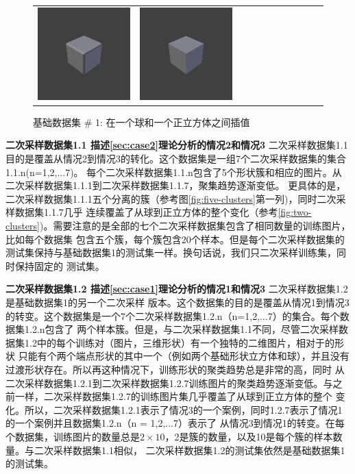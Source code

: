 \documentclass[bachelor, nocolorlinks, printoneside]{seuthesis} %
\begin{document}
\begin{Main}
\begin{figure}
\begin{tabular}{c@{}c@{}c@{}c@{}c@{}c@{}c@{}c@{}c@{}c@{}c@{}}
		\includegraphics[width=.09\textwidth,keepaspectratio]{figs/Isometric9.png} &
		\includegraphics[width=.09\textwidth,keepaspectratio]{figs/Isometric10.png} \\    	
	\end{tabular}
	\caption{\small 基础数据集 \# 1: 在一个球和一个正立方体之间插值}
    \label{fig:cube-sphere} \vspace{-4mm}
\end{figure}

\textbf{二次采样数据集1.1 描述\ref{sec:case2}理论分析的情况2和情况3} 二次采样数据集1.1目的是覆盖从情况2到情况3的转化。这个数据集是一组7个二次采样数据集的集合1.1.n(n=1,2,...7)。
每个二次采样数据集1.1.n包含了5个形状簇和相应的图片。从二次采样数据集1.1.1到二次采样数据集1.1.7，聚集趋势逐渐变低。
更具体的是，二次采样数据集1.1.1五个分离的簇（参考图\ref{fig:five-clusters}第一列)，同时二次采样数据集1.1.7几乎
连续覆盖了从球到正立方体的整个变化（参考\ref{fig:two-clusters})。需要注意的是全部的七个二次采样数据集包含了相同数量的训练图片，比如每个数据集
包含五个簇，每个簇包含20个样本。但是每个二次采样数据集的测试集保持与基础数据集1的测试集一样。换句话说，我们只二次采样训练集，同时保持固定的
测试集。

\textbf{二次采样数据集1.2 描述\ref{sec:case1}理论分析的情况1和情况3} 二次采样数据集1.2是基础数据集1的另一个二次采样
版本。这个数据集的目的是覆盖从情况1到情况3的转变。这个数据集是一个7个二次采样数据集1.2.n（n=1,2,$\ldots $7）的集合。每个数据集1.2.n包含了
两个样本簇。但是，与二次采样数据集1.1不同，尽管二次采样数据集1.2中的每个训练对（图片，三维形状）有一个独特的二维图片，相对于的形状
只能有个两个端点形状的其中一个（例如两个基础形状立方体和球），并且没有过渡形状存在。所以再这种情况下，训练形状的聚类趋势总是非常的高，同时
从二次采样数据集1.2.1到二次采样数据集1.2.7训练图片的聚类趋势逐渐变低。与之前一样，二次采样数据集1.2.7的训练图片集几乎覆盖了从球到正立方体的整个
变化。所以，二次采样数据集1.2.1表示了情况3的一个案例，同时1.2.7表示了情况1的一个案例并且数据集1.2.n（n = 1,2,$\ldots $7）表示了
从情况3到情况1的转变。在每个数据集，训练图片的数量总是$2\times10$，2是簇的数量，以及10是每个簇的样本数量。与二次采样数据集1.1相似，
二次采样数据集1.2的测试集依然是基础数据集1的测试集。


\end{Main}
\end{document}
